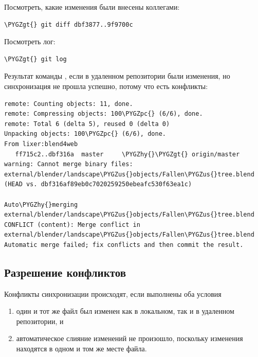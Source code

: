\documentclass[a4paper,12pt,oneside]{sphinxmanual}
\def\PYGZus{\char`\_}
\def\PYGZgt{\char`\>}
\def\PYGZpc{\char`\%}
\def\PYGZhy{\char`\-}
\begin{document}
Посмотреть, какие изменения были внесены коллегами:

\begin{Verbatim}[commandchars=\\\{\}]
\PYGZgt{} git diff dbf3877..9f9700c
\end{Verbatim}

Посмотреть лог:

\begin{Verbatim}[commandchars=\\\{\}]
\PYGZgt{} git log
\end{Verbatim}

Результат команды , если в удаленном репозитории были изменения, но синхронизация не прошла успешно, потому что есть конфликты:

\begin{Verbatim}[commandchars=\\\{\}]
remote: Counting objects: 11, done.
remote: Compressing objects: 100\PYGZpc{} (6/6), done.
remote: Total 6 (delta 5), reused 0 (delta 0)
Unpacking objects: 100\PYGZpc{} (6/6), done.
From lixer:blend4web
   ff715c2..dbf316a  master     \PYGZhy{}\PYGZgt{} origin/master
warning: Cannot merge binary files: external/blender/landscape\PYGZus{}objects/Fallen\PYGZus{}tree.blend (HEAD vs. dbf316af89eb0c7020259250ebeafc530f63ea1c)

Auto\PYGZhy{}merging external/blender/landscape\PYGZus{}objects/Fallen\PYGZus{}tree.blend
CONFLICT (content): Merge conflict in external/blender/landscape\PYGZus{}objects/Fallen\PYGZus{}tree.blend
Automatic merge failed; fix conflicts and then commit the result.
\end{Verbatim}


\subsection{Разрешение конфликтов}
\label{git_short_manual:index-7}\label{git_short_manual:id17}
Конфликты синхронизации происходят, если выполнены оба условия
\begin{enumerate}
\item {} 
один и тот же файл был изменен как в локальном, так и в удаленном репозитории, и

\item {} 
автоматическое слияние изменений не произошло, поскольку изменения находятся в одном и том же месте файла.

\end{enumerate}
\end{document}
